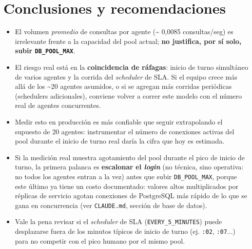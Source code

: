 \documentclass[11pt,a4paper]{article}
\begin{document}
\section{Conclusiones y recomendaciones}

\begin{itemize}[leftmargin=1.2cm]
  \item El volumen \emph{promedio} de consultas por agente (\textasciitilde
    0{,}0085 consultas/seg) es irrelevante frente a la capacidad del pool
    actual; \textbf{no justifica, por sí solo, subir \texttt{DB\_POOL\_MAX}}.
  \item El riesgo real está en la \textbf{coincidencia de ráfagas}: inicio
    de turno simultáneo de varios agentes y la corrida del \emph{scheduler}
    de SLA. Si el equipo crece más allá de los \textasciitilde 20 agentes
    asumidos, o si se agregan más corridas periódicas (schedulers
    adicionales), conviene volver a correr este modelo con el número real
    de agentes concurrentes.
  \item Medir esto en producción es más confiable que seguir extrapolando
    el supuesto de 20 agentes: instrumentar el número de conexiones activas
    del pool durante el inicio de turno real daría la cifra que hoy es
    estimada.
  \item Si la medición real muestra agotamiento del pool durante el pico de
    inicio de turno, la primera palanca es \textbf{escalonar el
    \emph{login}} (no técnica, sino operativa: no todos los agentes
    entran a la vez) antes que subir \texttt{DB\_POOL\_MAX}, porque este
    último ya tiene un costo documentado: valores altos multiplicados por
    réplicas de servicio agotan conexiones de PostgreSQL más rápido de lo
    que se gana en concurrencia (ver \texttt{CLAUDE.md}, sección de base de
    datos).
  \item Vale la pena revisar si el \emph{scheduler} de SLA
    (\texttt{EVERY\_5\_MINUTES}) puede desplazarse fuera de los minutos
    típicos de inicio de turno (ej. \texttt{:02}, \texttt{:07}...) para no
    competir con el pico humano por el mismo pool.
\end{itemize}
\end{document}
